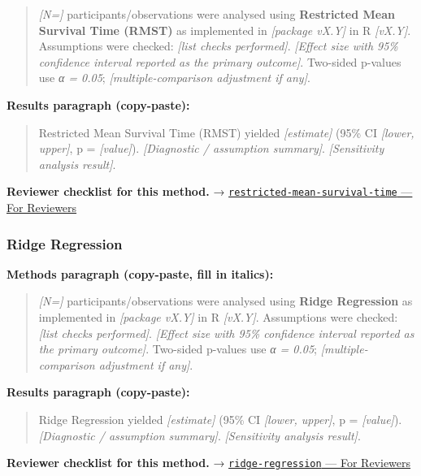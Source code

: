 \documentclass[
]{article}
\begin{document}
\begin{quote}
\emph{{[}N={]}} participants/observations were analysed using
\textbf{Restricted Mean Survival Time (RMST)} as implemented in
\emph{{[}package vX.Y{]}} in R \emph{{[}vX.Y{]}}. Assumptions were
checked: \emph{{[}list checks performed{]}}. \emph{{[}Effect size with
95\% confidence interval reported as the primary outcome{]}}. Two-sided
p-values use \emph{α = 0.05}; \emph{{[}multiple-comparison adjustment if
any{]}}.
\end{quote}

\textbf{Results paragraph (copy-paste):}

\begin{quote}
Restricted Mean Survival Time (RMST) yielded \emph{{[}estimate{]}} (95\%
CI \emph{{[}lower, upper{]}}, p = \emph{{[}value{]}}).
\emph{{[}Diagnostic / assumption summary{]}}. \emph{{[}Sensitivity
analysis result{]}}.
\end{quote}

\textbf{Reviewer checklist for this method.} →
\href{../chapters/11-survival/restricted-mean-survival-time.Rmd\#for-reviewers}{\texttt{restricted-mean-survival-time}
--- For Reviewers}

\subsubsection{Ridge Regression}\label{ridge-regression}

\textbf{Methods paragraph (copy-paste, fill in italics):}

\begin{quote}
\emph{{[}N={]}} participants/observations were analysed using
\textbf{Ridge Regression} as implemented in \emph{{[}package vX.Y{]}} in
R \emph{{[}vX.Y{]}}. Assumptions were checked: \emph{{[}list checks
performed{]}}. \emph{{[}Effect size with 95\% confidence interval
reported as the primary outcome{]}}. Two-sided p-values use \emph{α =
0.05}; \emph{{[}multiple-comparison adjustment if any{]}}.
\end{quote}

\textbf{Results paragraph (copy-paste):}

\begin{quote}
Ridge Regression yielded \emph{{[}estimate{]}} (95\% CI \emph{{[}lower,
upper{]}}, p = \emph{{[}value{]}}). \emph{{[}Diagnostic / assumption
summary{]}}. \emph{{[}Sensitivity analysis result{]}}.
\end{quote}

\textbf{Reviewer checklist for this method.} →
\href{../chapters/07-regression/ridge-regression.Rmd\#for-reviewers}{\texttt{ridge-regression}
--- For Reviewers}
\end{document}
